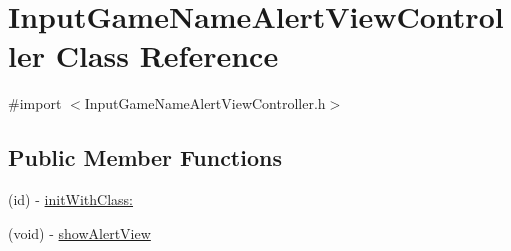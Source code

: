 \hypertarget{interface_input_game_name_alert_view_controller}{
\section{InputGameNameAlertViewController Class Reference}
\label{interface_input_game_name_alert_view_controller}
}


{\ttfamily \#import $<$InputGameNameAlertViewController.h$>$}

\subsection*{Public Member Functions}
\begin{DoxyCompactItemize}
\item 
(id) -\/ \hyperlink{interface_input_game_name_alert_view_controller_a489de7be4d51103f8b2cd0fdecc1c732}{initWithClass:}
\item 
(void) -\/ \hyperlink{interface_input_game_name_alert_view_controller_a3631e6bba9d49771905d43203c273749}{showAlertView}
\end{DoxyCompactItemize}
